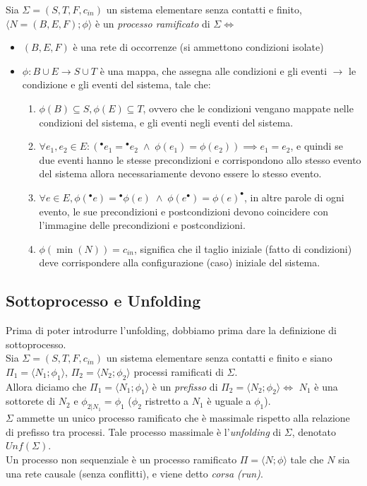 Sia $\Sigma = (S,T,F, c_{in})$ un sistema elementare senza contatti e finito, $\langle N = (B,E,F); \phi \rangle$ è un \textit{processo ramificato} di $\Sigma \iff$
\begin{itemize}
    \item $(B,E,F)$ è una rete di occorrenze (si ammettono condizioni isolate)
    \item$\phi : B \cup E \to S \cup T$ è una mappa, che assegna alle condizioni e gli eventi $\to$ le condizione e gli eventi del sistema, tale che:
    \begin{enumerate}
        \item $\phi(B)\subseteq S, \phi(E)\subseteq T$, ovvero che le condizioni vengano mappate nelle condizioni del sistema, e gli eventi negli eventi del sistema. 
        \item $\forall e_1, e_2 \in E: (^\bullet e_1 = {^\bullet e_2} \; \land \; \phi(e_1)= \phi(e_2)) \implies e_1 = e_2$, e quindi se due eventi hanno le stesse precondizioni e corrispondono allo stesso evento del sistema allora necessariamente devono essere lo stesso evento. 
        \item $\forall e \in E, \phi(^\bullet e) = {^\bullet \phi(e)} \; \land \; \phi(e ^\bullet) = {\phi(e)^\bullet}$, in altre parole di ogni evento, le sue precondizioni e postcondizioni devono coincidere con l’immagine delle precondizioni e postcondizioni.
        \item $\phi(\min(N)) = c_{in}$, significa che il taglio iniziale (fatto di condizioni) deve corrispondere alla configurazione (caso) iniziale del sistema.
    \end{enumerate}
\end{itemize}

\subsection{Sottoprocesso e Unfolding}
Prima di poter introdurre l'unfolding, dobbiamo prima dare la definizione di sottoprocesso. \\
Sia $\Sigma = (S,T,F, c_{in})$ un sistema elementare senza contatti e finito e siano $\Pi_1 = \langle N_1; \phi_1 \rangle$, $\Pi_2 = \langle N_2; \phi_2 \rangle$ processi ramificati di $\Sigma$. \\
Allora diciamo che $\Pi_1 = \langle N_1; \phi_1 \rangle$ è un \textit{prefisso} di $\Pi_2 = \langle N_2; \phi_2 \rangle \iff$ $N_1$ è una sottorete di $N_2$ e $\phi_{2|N_1} = \phi_1$ ($\phi_2$ ristretto a $N_1$ è uguale a $\phi_1$). \\

$\Sigma$ ammette un unico processo ramificato che è massimale rispetto alla relazione di prefisso tra processi. Tale processo massimale è l’\textit{unfolding} di $\Sigma$, denotato $Unf(\Sigma)$.\\

Un processo non sequenziale è un processo ramificato $\Pi = \langle N; \phi \rangle$ tale che $N$ sia una rete causale (senza conflitti), e viene detto \textit{corsa (run)}.
